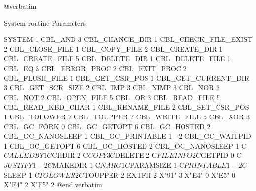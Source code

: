 @verbatim


System routine                  Parameters

SYSTEM                          1
CBL_AND                         3
CBL_CHANGE_DIR                  1
CBL_CHECK_FILE_EXIST            2
CBL_CLOSE_FILE                  1
CBL_COPY_FILE                   2
CBL_CREATE_DIR                  1
CBL_CREATE_FILE                 5
CBL_DELETE_DIR                  1
CBL_DELETE_FILE                 1
CBL_EQ                          3
CBL_ERROR_PROC                  2
CBL_EXIT_PROC                   2
CBL_FLUSH_FILE                  1
CBL_GET_CSR_POS                 1
CBL_GET_CURRENT_DIR             3
CBL_GET_SCR_SIZE                2
CBL_IMP                         3
CBL_NIMP                        3
CBL_NOR                         3
CBL_NOT                         2
CBL_OPEN_FILE                   5
CBL_OR                          3
CBL_READ_FILE                   5
CBL_READ_KBD_CHAR               1
CBL_RENAME_FILE                 2
CBL_SET_CSR_POS                 1
CBL_TOLOWER                     2
CBL_TOUPPER                     2
CBL_WRITE_FILE                  5
CBL_XOR                         3
CBL_GC_FORK                     0
CBL_GC_GETOPT                   6
CBL_GC_HOSTED                   2
CBL_GC_NANOSLEEP                1
CBL_GC_PRINTABLE                1 - 2
CBL_GC_WAITPID                  1
CBL_OC_GETOPT                   6
CBL_OC_HOSTED                   2
CBL_OC_NANOSLEEP                1
C$CALLEDBY                      1
C$CHDIR                         2
C$COPY                          3
C$DELETE                        2
C$FILEINFO                      2
C$GETPID                        0
C$JUSTIFY                       1 - 2
C$MAKEDIR                       1
C$NARG                          1
C$PARAMSIZE                     1
C$PRINTABLE                     1 - 2
C$SLEEP                         1
C$TOLOWER                       2
C$TOUPPER                       2
EXTFH                           2
X"91"                           3
X"E4"                           0
X"E5"                           0
X"F4"                           2
X"F5"                           2
@end verbatim
